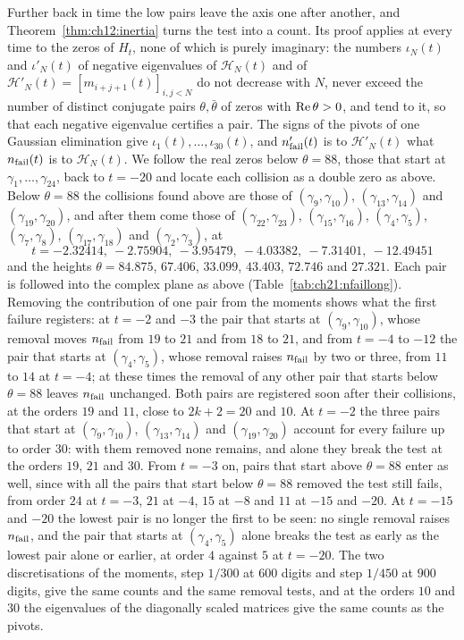 Further back in time the low pairs leave the axis one after another, and Theorem~\ref{thm:ch12:inertia} turns the test into a count. Its proof applies at every time to the zeros of $H_t$, none of which is purely imaginary: the numbers $\iota_N(t)$ and $\iota'_N(t)$ of negative eigenvalues of $\mathcal H_N(t)$ and of $\mathcal H'_N(t)=[m_{i+j+1}(t)]_{i,j<N}$ do not decrease with $N$, never exceed the number of distinct conjugate pairs $\theta,\bar\theta$ of zeros with $\operatorname{Re}\theta>0$, and tend to it, so that each negative eigenvalue certifies a pair. The signs of the pivots of one Gaussian elimination give $\iota_1(t),\dots,\iota_{30}(t)$, and $n'_{\rm fail}(t)$ is to $\mathcal H'_N(t)$ what $n_{\rm fail}(t)$ is to $\mathcal H_N(t)$. We follow the real zeros below $\theta=88$, those that start at $\gamma_1,\dots,\gamma_{24}$, back to $t=-20$ and locate each collision as a double zero as above. Below $\theta=88$ the collisions found above are those of $(\gamma_9,\gamma_{10})$, $(\gamma_{13},\gamma_{14})$ and $(\gamma_{19},\gamma_{20})$, and after them come those of $(\gamma_{22},\gamma_{23})$, $(\gamma_{15},\gamma_{16})$, $(\gamma_4,\gamma_5)$, $(\gamma_7,\gamma_8)$, $(\gamma_{17},\gamma_{18})$ and $(\gamma_2,\gamma_3)$, at
\[
t=-2.32414,\ -2.75904,\ -3.95479,\ -4.03382,\ -7.31401,\ -12.49451
\]
and the heights $\theta=84.875$, $67.406$, $33.099$, $43.403$, $72.746$ and $27.321$. Each pair is followed into the complex plane as above (Table~\ref{tab:ch21:nfaillong}). Removing the contribution of one pair from the moments shows what the first failure registers: at $t=-2$ and $-3$ the pair that starts at $(\gamma_9,\gamma_{10})$, whose removal moves $n_{\rm fail}$ from $19$ to $21$ and from $18$ to $21$, and from $t=-4$ to $-12$ the pair that starts at $(\gamma_4,\gamma_5)$, whose removal raises $n_{\rm fail}$ by two or three, from $11$ to $14$ at $t=-4$; at these times the removal of any other pair that starts below $\theta=88$ leaves $n_{\rm fail}$ unchanged. Both pairs are registered soon after their collisions, at the orders $19$ and $11$, close to $2k+2=20$ and $10$. At $t=-2$ the three pairs that start at $(\gamma_9,\gamma_{10})$, $(\gamma_{13},\gamma_{14})$ and $(\gamma_{19},\gamma_{20})$ account for every failure up to order $30$: with them removed none remains, and alone they break the test at the orders $19$, $21$ and $30$. From $t=-3$ on, pairs that start above $\theta=88$ enter as well, since with all the pairs that start below $\theta=88$ removed the test still fails, from order $24$ at $t=-3$, $21$ at $-4$, $15$ at $-8$ and $11$ at $-15$ and $-20$. At $t=-15$ and $-20$ the lowest pair is no longer the first to be seen: no single removal raises $n_{\rm fail}$, and the pair that starts at $(\gamma_4,\gamma_5)$ alone breaks the test as early as the lowest pair alone or earlier, at order $4$ against $5$ at $t=-20$. The two discretisations of the moments, step $1/300$ at $600$ digits and step $1/450$ at $900$ digits, give the same counts and the same removal tests, and at the orders $10$ and $30$ the eigenvalues of the diagonally scaled matrices give the same counts as the pivots.

